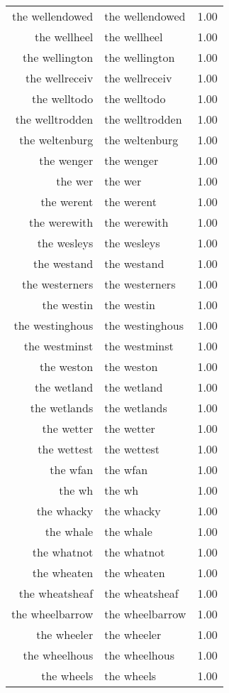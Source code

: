 \begin{table}[ht]
\begin{tabular}{rlr}
  the wellendowed & the wellendowed & 1.00 \\ 
  the wellheel & the wellheel & 1.00 \\ 
  the wellington & the wellington & 1.00 \\ 
  the wellreceiv & the wellreceiv & 1.00 \\ 
  the welltodo & the welltodo & 1.00 \\ 
  the welltrodden & the welltrodden & 1.00 \\ 
  the weltenburg & the weltenburg & 1.00 \\ 
  the wenger & the wenger & 1.00 \\ 
  the wer & the wer & 1.00 \\ 
  the werent & the werent & 1.00 \\ 
  the werewith & the werewith & 1.00 \\ 
  the wesleys & the wesleys & 1.00 \\ 
  the westand & the westand & 1.00 \\ 
  the westerners & the westerners & 1.00 \\ 
  the westin & the westin & 1.00 \\ 
  the westinghous & the westinghous & 1.00 \\ 
  the westminst & the westminst & 1.00 \\ 
  the weston & the weston & 1.00 \\ 
  the wetland & the wetland & 1.00 \\ 
  the wetlands & the wetlands & 1.00 \\ 
  the wetter & the wetter & 1.00 \\ 
  the wettest & the wettest & 1.00 \\ 
  the wfan & the wfan & 1.00 \\ 
  the wh & the wh & 1.00 \\ 
  the whacky & the whacky & 1.00 \\ 
  the whale & the whale & 1.00 \\ 
  the whatnot & the whatnot & 1.00 \\ 
  the wheaten & the wheaten & 1.00 \\ 
  the wheatsheaf & the wheatsheaf & 1.00 \\ 
  the wheelbarrow & the wheelbarrow & 1.00 \\ 
  the wheeler & the wheeler & 1.00 \\ 
  the wheelhous & the wheelhous & 1.00 \\ 
  the wheels & the wheels & 1.00 \\ 

\end{tabular}
\end{table}
